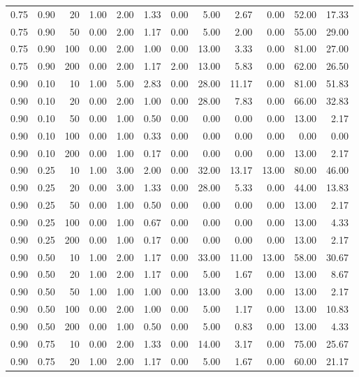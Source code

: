 \documentclass{bmstu}
\begin{document}
\begin{longtable}{|r|r|r|r|r|r|r|r|r|r|r|r|}
0.75 & 0.90 & 20 & 1.00 & 2.00 & 1.33 & 0.00 & 5.00 & 2.67 & 0.00 & 52.00 & 17.33  \\
0.75 & 0.90 & 50 & 0.00 & 2.00 & 1.17 & 0.00 & 5.00 & 2.00 & 0.00 & 55.00 & 29.00  \\
0.75 & 0.90 & 100 & 0.00 & 2.00 & 1.00 & 0.00 & 13.00 & 3.33 & 0.00 & 81.00 & 27.00  \\
0.75 & 0.90 & 200 & 0.00 & 2.00 & 1.17 & 2.00 & 13.00 & 5.83 & 0.00 & 62.00 & 26.50  \\
\hline
0.90 & 0.10 & 10 & 1.00 & 5.00 & 2.83 & 0.00 & 28.00 & 11.17 & 0.00 & 81.00 & 51.83  \\
0.90 & 0.10 & 20 & 0.00 & 2.00 & 1.00 & 0.00 & 28.00 & 7.83 & 0.00 & 66.00 & 32.83  \\
0.90 & 0.10 & 50 & 0.00 & 1.00 & 0.50 & 0.00 & 0.00 & 0.00 & 0.00 & 13.00 & 2.17  \\
0.90 & 0.10 & 100 & 0.00 & 1.00 & 0.33 & 0.00 & 0.00 & 0.00 & 0.00 & 0.00 & 0.00  \\
0.90 & 0.10 & 200 & 0.00 & 1.00 & 0.17 & 0.00 & 0.00 & 0.00 & 0.00 & 13.00 & 2.17  \\
\hline
0.90 & 0.25 & 10 & 1.00 & 3.00 & 2.00 & 0.00 & 32.00 & 13.17 & 13.00 & 80.00 & 46.00  \\
0.90 & 0.25 & 20 & 0.00 & 3.00 & 1.33 & 0.00 & 28.00 & 5.33 & 0.00 & 44.00 & 13.83  \\
0.90 & 0.25 & 50 & 0.00 & 1.00 & 0.50 & 0.00 & 0.00 & 0.00 & 0.00 & 13.00 & 2.17  \\
0.90 & 0.25 & 100 & 0.00 & 1.00 & 0.67 & 0.00 & 0.00 & 0.00 & 0.00 & 13.00 & 4.33  \\
0.90 & 0.25 & 200 & 0.00 & 1.00 & 0.17 & 0.00 & 0.00 & 0.00 & 0.00 & 13.00 & 2.17  \\
\hline
0.90 & 0.50 & 10 & 1.00 & 2.00 & 1.17 & 0.00 & 33.00 & 11.00 & 13.00 & 58.00 & 30.67  \\
0.90 & 0.50 & 20 & 1.00 & 2.00 & 1.17 & 0.00 & 5.00 & 1.67 & 0.00 & 13.00 & 8.67  \\
0.90 & 0.50 & 50 & 1.00 & 1.00 & 1.00 & 0.00 & 13.00 & 3.00 & 0.00 & 13.00 & 2.17  \\
0.90 & 0.50 & 100 & 0.00 & 2.00 & 1.00 & 0.00 & 5.00 & 1.17 & 0.00 & 13.00 & 10.83  \\
0.90 & 0.50 & 200 & 0.00 & 1.00 & 0.50 & 0.00 & 5.00 & 0.83 & 0.00 & 13.00 & 4.33  \\
\hline
0.90 & 0.75 & 10 & 0.00 & 2.00 & 1.33 & 0.00 & 14.00 & 3.17 & 0.00 & 75.00 & 25.67  \\
0.90 & 0.75 & 20 & 1.00 & 2.00 & 1.17 & 0.00 & 5.00 & 1.67 & 0.00 & 60.00 & 21.17  \\

\end{longtable}
\end{document}
